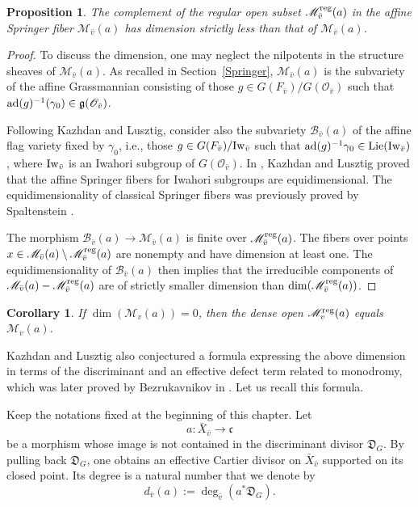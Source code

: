 \documentclass[12pt,english]{smfart}
\numberwithin{equation}{subsection}
\newtheorem{proposition}[equation]{Proposition}
\newtheorem{corollary}[equation]{Corollary}
\theoremstyle{remark}
\newcommand\calB{{\mathscr B}}
\newcommand\calM{{\mathscr M}}
\newcommand\calO{{\mathscr O}}
\newcommand\frakg{{\mathfrak g}}
\newcommand\frakc{{\mathfrak c}}
\newcommand\Lie{{\rm Lie}}
\newcommand\ad{{\rm ad}}
\newcommand\reg{{\rm reg}}
\newcommand\discrim{\mathfrak D}
\begin{document}
\begin{proposition}\label{dimension du complement}
The complement of the regular open subset $\calM_{\bar v}^\reg(a)$ in the affine Springer fiber $\calM_{\bar v}(a)$ has dimension strictly less than that of $\calM_{\bar v}(a)$.
\end{proposition}

\begin{proof}
To discuss the dimension, one may neglect the nilpotents in the structure sheaves of $\calM_{\bar v}(a)$. As recalled in Section~\ref{Springer}, $\calM_{\bar v}(a)$ is the subvariety of the affine Grassmannian consisting of those $g\in G(F_{\bar v})/G(\calO_{\bar v})$ such that $\ad(g)^{-1}(\gamma_0)\in \frakg(\calO_{\bar v})$.

Following Kazhdan and Lusztig, consider also the subvariety $\calB_{\bar v}(a)$ of the affine flag variety fixed by $\gamma_0$, i.e., those $g\in G(F_{\bar v})/{\rm Iw}_{\bar v}$ such that $\ad(g)^{-1}\gamma_0\in \Lie({\rm Iw}_{\bar v})$, where ${\rm Iw}_{\bar v}$ is an Iwahori subgroup of $G(\calO_{\bar v})$. In \cite{KL}, Kazhdan and Lusztig proved that the affine Springer fibers for Iwahori subgroups are equidimensional. The equidimensionality of classical Springer fibers was previously proved by Spaltenstein \cite{Sp}.

The morphism $\calB_{\bar v}(a)\to \calM_{\bar v}(a)$ is finite over $\calM_{\bar v}^\reg(a)$. The fibers over points $x\in\calM_{\bar v}(a)\setminus \calM_{\bar v}^\reg(a)$ are nonempty and have dimension at least one. The equidimensionality of $\calB_{\bar v}(a)$ then implies that the irreducible components of $\calM_{\bar v}(a)-\calM_{\bar v}^\reg(a)$ are of strictly smaller dimension than $\dim(\calM_{\bar v}^\reg(a))$.
\end{proof}

\begin{corollary}\label{dim zero}
If $\dim(\calM_v(a))=0$, then the dense open $\calM_v^\reg(a)$ equals $\calM_v(a)$.
\end{corollary}

Kazhdan and Lusztig also conjectured a formula expressing the above dimension in terms of the discriminant and an effective defect term related to monodromy, which was later proved by Bezrukavnikov in \cite{Bz}. Let us recall this formula.

Keep the notations fixed at the beginning of this chapter. Let 
$$a:\bar X_{\bar v} \to \frakc$$ 
be a morphism whose image is not contained in the discriminant divisor $\discrim_G$. By pulling back $\discrim_G$, one obtains an effective Cartier divisor on $\bar X_{\bar v}$ supported on its closed point. Its degree is a natural number that we denote by
$$
d_{\bar v}(a):=\deg_{\bar v}(a^*{\discrim_G}).
$$
\end{document}

